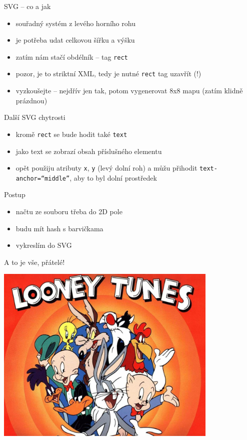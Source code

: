 \documentclass{beamer}
\begin{document}
\begin{frame}{SVG -- co a jak}
  \begin{itemize}
    \item souřadný systém z levého horního rohu
    \item je potřeba udat celkovou šířku a výšku
    \item zatím nám stačí obdélník -- tag \texttt{rect}
    \item pozor, je to striktní XML, tedy je nutné \texttt{rect} tag uzavřít (!)
    \item vyzkoušejte -- nejdřív jen tak, potom vygenerovat 8x8 mapu (zatím klidně prázdnou)
  \end{itemize}
\end{frame}

\begin{frame}{Další SVG chytrosti}
  \begin{itemize}
    \item kromě \texttt{rect} se bude hodit také \texttt{text}
    \item jako text se zobrazí obsah příslušného elementu
    \item opět použiju atributy \texttt{x}, \texttt{y} (levý dolní roh) a můžu přihodit \texttt{text-anchor=``middle''}, aby to byl dolní prostředek
  \end{itemize}
\end{frame}

\begin{frame}{Postup}
  \begin{itemize}
    \item načtu ze souboru třeba do 2D pole
    \item budu mít hash s barvičkama
    \item vykreslím do SVG
  \end{itemize}
\end{frame}

\begin{frame}{A to je vše, přátelé!}
  \begin{center}
    \includegraphics[width=0.8\textwidth]{looney_tunes}
  \end{center}
\end{frame}
\end{document}

